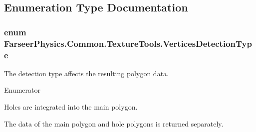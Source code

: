 \subsection{Enumeration Type Documentation}
\hypertarget{namespace_farseer_physics_1_1_common_1_1_texture_tools_a8c78f960d4da62793329adae2e15d451}{
\subsubsection[{Vertices\+Detection\+Type}]{\setlength{\rightskip}{0pt plus 5cm}enum {\bf Farseer\+Physics.\+Common.\+Texture\+Tools.\+Vertices\+Detection\+Type}}}\label{namespace_farseer_physics_1_1_common_1_1_texture_tools_a8c78f960d4da62793329adae2e15d451}


The detection type affects the resulting polygon data. 

\begin{Desc}
\item[Enumerator]\par
\begin{description}
\item[{\em 
\hypertarget{namespace_farseer_physics_1_1_common_1_1_texture_tools_a8c78f960d4da62793329adae2e15d451a92d909e2ae45ed6c55a55088f1d46394}{Integrated}\label{namespace_farseer_physics_1_1_common_1_1_texture_tools_a8c78f960d4da62793329adae2e15d451a92d909e2ae45ed6c55a55088f1d46394}
}]Holes are integrated into the main polygon. \item[{\em 
\hypertarget{namespace_farseer_physics_1_1_common_1_1_texture_tools_a8c78f960d4da62793329adae2e15d451a606970f24025625f40867ff6d152fa1e}{Separated}\label{namespace_farseer_physics_1_1_common_1_1_texture_tools_a8c78f960d4da62793329adae2e15d451a606970f24025625f40867ff6d152fa1e}
}]The data of the main polygon and hole polygons is returned separately. \end{description}
\end{Desc}
